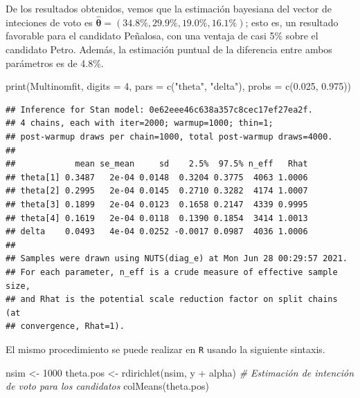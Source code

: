 \documentclass[
  10pt,
  spanish,
]{book}
\newenvironment{Shaded}{\begin{snugshade}}{\end{snugshade}}
\newcommand{\AttributeTok}[1]{\textcolor[rgb]{0.77,0.63,0.00}{#1}}
\newcommand{\CommentTok}[1]{\textcolor[rgb]{0.56,0.35,0.01}{\textit{#1}}}
\newcommand{\DecValTok}[1]{\textcolor[rgb]{0.00,0.00,0.81}{#1}}
\newcommand{\FloatTok}[1]{\textcolor[rgb]{0.00,0.00,0.81}{#1}}
\newcommand{\FunctionTok}[1]{\textcolor[rgb]{0.00,0.00,0.00}{#1}}
\newcommand{\NormalTok}[1]{#1}
\newcommand{\OtherTok}[1]{\textcolor[rgb]{0.56,0.35,0.01}{#1}}
\newcommand{\SpecialCharTok}[1]{\textcolor[rgb]{0.00,0.00,0.00}{#1}}
\newcommand{\StringTok}[1]{\textcolor[rgb]{0.31,0.60,0.02}{#1}}
\theoremstyle{definition}
\theoremstyle{definition}
\theoremstyle{definition}
\theoremstyle{definition}
\theoremstyle{remark}
\begin{document}
De los resultados obtenidos, vemos que la estimación bayesiana del vector de inteciones de voto es \(\hat{\boldsymbol \theta}=(34.8\%, 29.9\%, 19.0\%, 16.1\%)\); esto es, un resultado favorable para el candidato Peñalosa, con una ventaja de casi 5\% sobre el candidato Petro. Además, la estimación puntual de la diferencia entre ambos parámetros es de 4.8\%.

\begin{Shaded}
\begin{Highlighting}[]
\FunctionTok{print}\NormalTok{(Multinomfit, }\AttributeTok{digits =} \DecValTok{4}\NormalTok{, }
      \AttributeTok{pars =} \FunctionTok{c}\NormalTok{(}\StringTok{"theta"}\NormalTok{, }\StringTok{"delta"}\NormalTok{), }\AttributeTok{probs =} \FunctionTok{c}\NormalTok{(}\FloatTok{0.025}\NormalTok{, }\FloatTok{0.975}\NormalTok{))}
\end{Highlighting}
\end{Shaded}

\begin{verbatim}
## Inference for Stan model: 0e62eee46c638a357c8cec17ef27ea2f.
## 4 chains, each with iter=2000; warmup=1000; thin=1; 
## post-warmup draws per chain=1000, total post-warmup draws=4000.
## 
##            mean se_mean     sd    2.5%  97.5% n_eff   Rhat
## theta[1] 0.3487   2e-04 0.0148  0.3204 0.3775  4063 1.0006
## theta[2] 0.2995   2e-04 0.0145  0.2710 0.3282  4174 1.0007
## theta[3] 0.1899   2e-04 0.0123  0.1658 0.2147  4339 0.9995
## theta[4] 0.1619   2e-04 0.0118  0.1390 0.1854  3414 1.0013
## delta    0.0493   4e-04 0.0252 -0.0017 0.0987  4036 1.0006
## 
## Samples were drawn using NUTS(diag_e) at Mon Jun 28 00:29:57 2021.
## For each parameter, n_eff is a crude measure of effective sample size,
## and Rhat is the potential scale reduction factor on split chains (at 
## convergence, Rhat=1).
\end{verbatim}

El mismo procedimiento se puede realizar en \texttt{R} usando la siguiente sintaxis.

\begin{Shaded}
\begin{Highlighting}[]
\NormalTok{nsim }\OtherTok{\textless{}{-}} \DecValTok{1000}
\NormalTok{theta.pos }\OtherTok{\textless{}{-}} \FunctionTok{rdirichlet}\NormalTok{(nsim, y }\SpecialCharTok{+}\NormalTok{ alpha)}
\CommentTok{\# Estimación de intención de voto para los candidatos}
\FunctionTok{colMeans}\NormalTok{(theta.pos)}
\end{Highlighting}
\end{Shaded}
\end{document}
